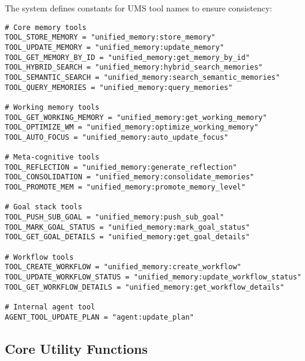 \documentclass[12pt,a4paper]{article}
\begin{document}
The system defines constants for UMS tool names to ensure consistency:
\begin{pageablecode}
\begin{verbatim}
# Core memory tools
TOOL_STORE_MEMORY = "unified_memory:store_memory"
TOOL_UPDATE_MEMORY = "unified_memory:update_memory"
TOOL_GET_MEMORY_BY_ID = "unified_memory:get_memory_by_id"
TOOL_HYBRID_SEARCH = "unified_memory:hybrid_search_memories"
TOOL_SEMANTIC_SEARCH = "unified_memory:search_semantic_memories"
TOOL_QUERY_MEMORIES = "unified_memory:query_memories"

# Working memory tools
TOOL_GET_WORKING_MEMORY = "unified_memory:get_working_memory"
TOOL_OPTIMIZE_WM = "unified_memory:optimize_working_memory"
TOOL_AUTO_FOCUS = "unified_memory:auto_update_focus"

# Meta-cognitive tools
TOOL_REFLECTION = "unified_memory:generate_reflection"
TOOL_CONSOLIDATION = "unified_memory:consolidate_memories"
TOOL_PROMOTE_MEM = "unified_memory:promote_memory_level"

# Goal stack tools
TOOL_PUSH_SUB_GOAL = "unified_memory:push_sub_goal"
TOOL_MARK_GOAL_STATUS = "unified_memory:mark_goal_status"
TOOL_GET_GOAL_DETAILS = "unified_memory:get_goal_details"

# Workflow tools
TOOL_CREATE_WORKFLOW = "unified_memory:create_workflow"
TOOL_UPDATE_WORKFLOW_STATUS = "unified_memory:update_workflow_status"
TOOL_GET_WORKFLOW_DETAILS = "unified_memory:get_workflow_details"

# Internal agent tool
AGENT_TOOL_UPDATE_PLAN = "agent:update_plan"
\end{verbatim}
\end{pageablecode}

\subsection*{Core Utility Functions}
\end{document}
